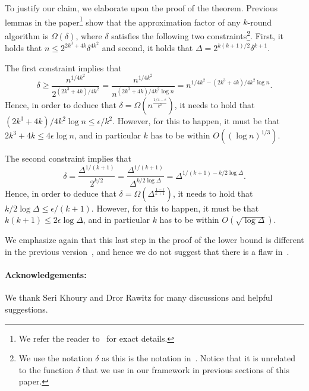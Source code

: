 \documentclass[11pt]{article}
\begin{document}
To justify our claim, we elaborate upon the proof of the theorem.
Previous lemmas in the paper\footnote{We refer the reader to~\cite{KMW10} for exact details.} show that the approximation factor of any $k$-round algorithm is $\Omega(\delta)$, where $\delta$ satisfies the following two constraints\footnote{We use the notation $\delta$ as this is the notation in~\cite{KMW10}. Notice that it is unrelated to the function $\delta$ that we use in our framework in previous sections of this paper.}. First, it holds that $n \leq 2^{2k^3+4k}\delta^{4k^2}$ and second, it holds that $\Delta = 2^{k(k+1)/2}\delta^{k+1}$.

The first constraint implies that
$$\delta \geq \frac{n^{1/4k^2}}{2^{(2k^3+4k)/4k^2}} = \frac{n^{1/4k^2}}{n^{(2k^3+4k)/4k^2\log{n}}} = n^{1/4k^2-(2k^3+4k)/4k^2\log{n}}.$$
Hence, in order to deduce that $\delta = \Omega(n^{\frac{1/4-\epsilon}{k^2}})$, it needs to hold that $(2k^3+4k)/4k^2\log{n}\leq \epsilon/k^2$. However, for this to happen, it must be that $2k^3+4k \leq 4\epsilon\log{n}$, and in particular $k$ has to be within $O((\log{n})^{1/3})$.

The second constraint implies that
$$\delta = \frac{\Delta^{1/(k+1)}}{2^{k/2}} = \frac{\Delta^{1/(k+1)}}{\Delta^{k/2\log{\Delta}}} = \Delta^{1/(k+1)-k/2\log{\Delta}}.$$
Hence, in order to deduce that $\delta = \Omega(\Delta^{\frac{1-\epsilon}{k+1}})$, it needs to hold that $k/2\log{\Delta}\leq \epsilon/(k+1)$. However, for this to happen, it must be that $k(k+1) \leq 2\epsilon\log{\Delta}$, and in particular $k$ has to be within $O(\sqrt{\log{\Delta}})$.

We emphasize again that this last step in the proof of the lower bound is different in the previous version~\cite{KMW04}, and hence we do not suggest that there is a flaw in~\cite{KMW04}.

\paragraph{Acknowledgements:} We thank Seri Khoury and Dror Rawitz for many discussions and helpful suggestions.



\end{document}

